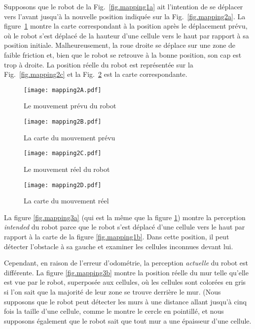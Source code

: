 Supposons que le robot de la Fig.~\ref{fig.mapping1a} ait l'intention de se déplacer vers l'avant jusqu'à la nouvelle position indiquée sur la Fig.~\ref{fig.mapping2a}. La figure~\ref{fig.mapping2b} montre la carte correspondant à la position après le déplacement prévu, où le robot s'est déplacé de la hauteur d'une cellule vers le haut par rapport à sa position initiale. Malheureusement, la roue droite se déplace sur une zone de faible friction et, bien que le robot se retrouve à la bonne position, son cap est trop à droite. La position réelle du robot est représentée sur la Fig.~\ref{fig.mapping2c} et la Fig.~\ref{fig.mapping2d} est la carte correspondante.

\begin{figure}
\begin{minipage}{.45\textwidth}
\texttt{[image: mapping2A.pdf]}
\caption{Le mouvement prévu du robot}
\label{fig.mapping2a}
\end{minipage}
\hspace{\fill}
\begin{minipage}{.45\textwidth}
\texttt{[image: mapping2B.pdf]}
\caption{La carte du mouvement prévu}
\label{fig.mapping2b}
\end{minipage}
\end{figure}

\begin{figure}
\begin{minipage}{.45\textwidth}
\texttt{[image: mapping2C.pdf]}
\caption{Le mouvement réel du robot}
\label{fig.mapping2c}
\end{minipage}
\hspace{\fill}
\begin{minipage}{.45\textwidth}
\texttt{[image: mapping2D.pdf]}
\caption{La carte du mouvement réel}
\label{fig.mapping2d}
\end{minipage}
\end{figure}

La figure \ref{fig.mapping3a} (qui est la même que la figure \ref{fig.mapping2b}) montre la perception \emph{intended} du robot parce que le robot s'est déplacé d'une cellule vers le haut par rapport à la carte de la figure \ref{fig.mapping1b}. Dans cette position, il peut détecter l'obstacle à sa gauche et examiner les cellules inconnues devant lui.

Cependant, en raison de l'erreur d'odométrie, la perception \emph{actuelle} du robot est différente. La figure \ref{fig.mapping3b} montre la position réelle du mur telle qu'elle est vue par le robot, superposée aux cellules, où les cellules sont colorées en gris si l'on sait que la majorité de leur zone se trouve derrière le mur. (Nous supposons que le robot peut détecter les murs à une distance allant jusqu'à cinq fois la taille d'une cellule, comme le montre le cercle en pointillé, et nous supposons également que le robot sait que tout mur a une épaisseur d'une cellule.

